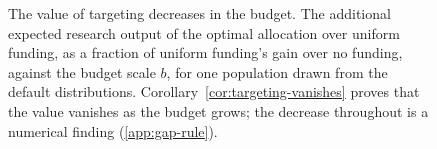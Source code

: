 \begin{figure}[tp]
\centering
{}
\caption{The value of targeting decreases in the budget. The additional expected research output of the optimal allocation over uniform funding, as a fraction of uniform funding's gain over no funding, against the budget scale $b$, for one population drawn from the default distributions. Corollary~\ref{cor:targeting-vanishes} proves that the value vanishes as the budget grows; the decrease throughout is a numerical finding (\ref{app:gap-rule}).}
\label{fig:targeting-value}
\end{figure}
